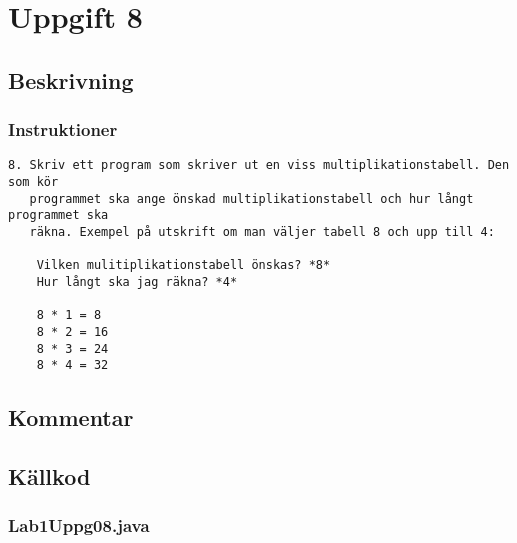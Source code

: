 \section{Uppgift 8}\label{uppgift-8}

\subsection{Beskrivning}

\subsubsection*{Instruktioner}
\begin{verbatim}
8. Skriv ett program som skriver ut en viss multiplikationstabell. Den som kör
   programmet ska ange önskad multiplikationstabell och hur långt programmet ska
   räkna. Exempel på utskrift om man väljer tabell 8 och upp till 4:

    Vilken mulitiplikationstabell önskas? *8*
    Hur långt ska jag räkna? *4*

    8 * 1 = 8
    8 * 2 = 16
    8 * 3 = 24
    8 * 4 = 32
\end{verbatim}

\subsection{Kommentar}

\subsection{Källkod}\label{uppgift-8_src}
\subsubsection*{Lab1Uppg08.java}
\inputminted[]{java}{src/Lab1Uppg08.java}
